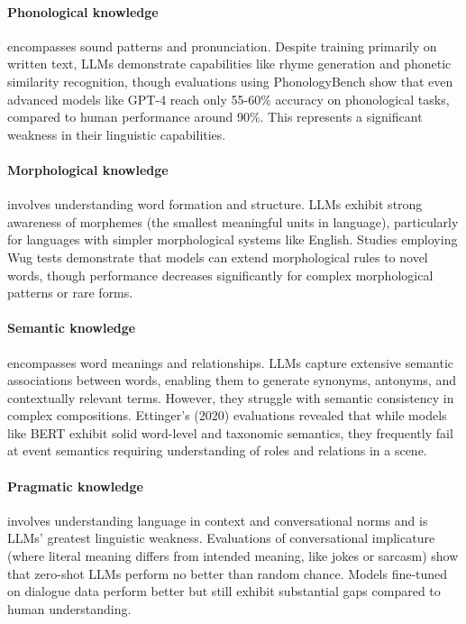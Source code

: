 \documentclass{article}
\newcounter{para}
\begin{document}
\paragraph{Phonological knowledge} encompasses sound patterns and pronunciation. Despite training primarily on written text, LLMs demonstrate capabilities like rhyme generation and phonetic similarity recognition, though evaluations using PhonologyBench show that even advanced models like GPT-4 reach only 55-60\% accuracy on phonological tasks, compared to human performance around 90\%. This represents a significant weakness in their linguistic capabilities.

\paragraph{Morphological knowledge} involves understanding word formation and structure. LLMs exhibit strong awareness of morphemes (the smallest meaningful units in language), particularly for languages with simpler morphological systems like English. Studies employing Wug tests demonstrate that models can extend morphological rules to novel words, though performance decreases significantly for complex morphological patterns or rare forms.

\paragraph{Semantic knowledge} encompasses word meanings and relationships. LLMs capture extensive semantic associations between words, enabling them to generate synonyms, antonyms, and contextually relevant terms. However, they struggle with semantic consistency in complex compositions. Ettinger's (2020) evaluations revealed that while models like BERT exhibit solid word-level and taxonomic semantics, they frequently fail at event semantics requiring understanding of roles and relations in a scene.

\paragraph{Pragmatic knowledge} involves understanding language in context and conversational norms and is LLMs' greatest linguistic weakness. Evaluations of conversational implicature (where literal meaning differs from intended meaning, like jokes or sarcasm) show that zero-shot LLMs perform no better than random chance. Models fine-tuned on dialogue data perform better but still exhibit substantial gaps compared to human understanding.
\end{document}
